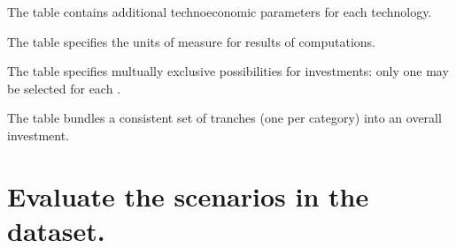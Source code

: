 \documentclass[letterpaper,10pt,english]{sphinxmanual}
\begin{document}
\begin{sphinxVerbatim}[commandchars=\\\{\}]
\end{sphinxVerbatim}



\sphinxAtStartPar
The  table contains additional techno\sphinxhyphen{}economic parameters for each technology.

\begin{sphinxVerbatim}[commandchars=\\\{\}]
\end{sphinxVerbatim}



\sphinxAtStartPar
The  table specifies the units of measure for results of computations.

\begin{sphinxVerbatim}[commandchars=\\\{\}]
\end{sphinxVerbatim}



\sphinxAtStartPar
The  table specifies multually exclusive possibilities for investments: only one  may be selected for each .

\begin{sphinxVerbatim}[commandchars=\\\{\}]
\end{sphinxVerbatim}



\sphinxAtStartPar
The  table bundles a consistent set of tranches (one per category) into an overall investment.

\begin{sphinxVerbatim}[commandchars=\\\{\}]
\end{sphinxVerbatim}




\section{Evaluate the scenarios in the dataset.}
\label{\detokenize{example-analysis:evaluate-the-scenarios-in-the-dataset}}
\begin{sphinxVerbatim}[commandchars=\\\{\}]
  
\end{sphinxVerbatim}
\end{document}
